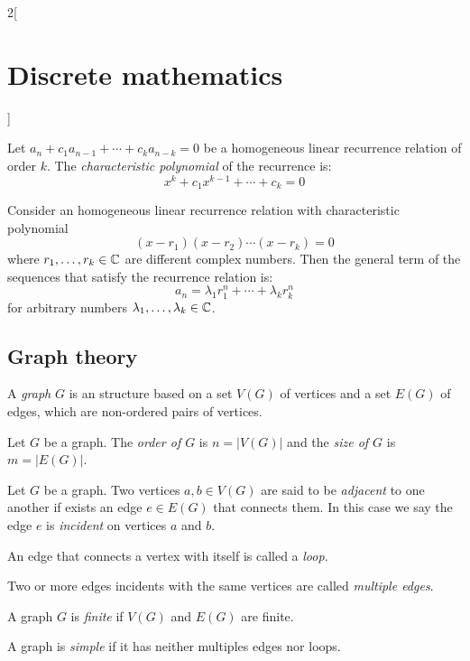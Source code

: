 \documentclass[../../../main.tex]{subfiles}
\begin{document}
\begin{multicols}{2}[\section{Discrete mathematics}]
  \begin{definition}
    Let $a_n+c_1a_{n-1}+\cdots+c_ka_{n-k}=0$ be a homogeneous linear recurrence relation of order $k$. The \textit{characteristic polynomial} of the recurrence is: $$x^k+c_1x^{k-1}+\cdots+c_k=0$$
  \end{definition}
  \begin{prop}
    Consider an homogeneous linear recurrence relation with characteristic polynomial $$(x-r_1)(x-r_2)\cdots(x-r_k)=0$$ where $r_1,\ldots,r_k\in\mathbb{C} $ are different complex numbers. Then the general term of the sequences that satisfy the recurrence relation is: $$a_n=\lambda_1r_1^n+\cdots+\lambda_kr_k^n$$ for arbitrary numbers $\lambda_1,\ldots,\lambda_k\in\mathbb{C} $.
  \end{prop}
  \subsection{Graph theory}
  \begin{definition}
    A \textit{graph} $G$ is an structure based on a set $V(G)$ of vertices and a set $E(G)$ of edges, which are non-ordered pairs of vertices.
  \end{definition}
  \begin{definition}
    Let $G$ be a graph. The \textit{order of $G$} is $n=|V(G)|$ and the \textit{size of $G$} is $m=|E(G)|$.
  \end{definition}
  \begin{definition}
    Let $G$ be a graph. Two vertices $a,b\in V(G)$ are said to be \textit{adjacent} to one another if exists an edge $e\in E(G)$ that connects them. In this case we say the edge $e$ is \textit{incident} on vertices $a$ and $b$.
  \end{definition}
  \begin{definition}
    An edge that connects a vertex with itself is called a \textit{loop}.
  \end{definition}
  \begin{definition}
    Two or more edges incidents with the same vertices are called \textit{multiple edges}.
  \end{definition}
  \begin{definition}
    A graph $G$ is \textit{finite} if $V(G)$ and $E(G)$ are finite.
  \end{definition}
  \begin{definition}
    A graph is \textit{simple} if it has neither multiples edges nor loops.
  \end{definition}

\end{multicols}
\end{document}
